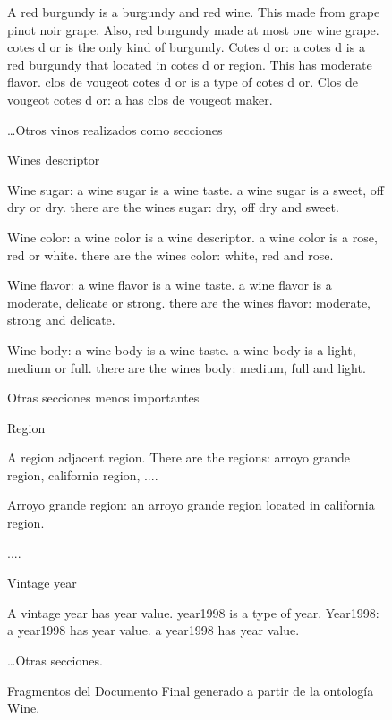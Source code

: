 \begin{figure}
{\begin{minipage}{14cm}
\small{
A red burgundy is a burgundy and red wine. This made from grape pinot noir grape. Also, red burgundy made at most one wine grape. cotes d or is the only kind of burgundy. 
Cotes d or: a cotes d is a red burgundy that located in cotes d or region. This has moderate flavor. clos de vougeot cotes d or is a type of cotes d or. 
Clos de vougeot cotes d or:	a has clos de vougeot maker. 
}

\small{\dots Otros vinos realizados como secciones}

\large{
 Wines descriptor
}

\small{
Wine sugar:	a wine sugar is a wine taste. a wine sugar is a sweet, off dry or dry. there are the wines sugar: dry, off dry and sweet. 

Wine color: a wine color is a wine descriptor. a wine color is a rose, red or white. there are the wines color: white, red and rose. 

Wine flavor: a wine flavor is a wine taste. a wine flavor is a moderate, delicate or strong. there are the wines flavor: moderate, strong and delicate. 

Wine body: a wine body is a wine taste. a wine body is a light, medium or full. there are the wines body: medium, full and light. 
}

\large{
\noindent Otras secciones menos importantes
}

\large{
 Region
}

\small{
A region adjacent region. There are the regions: arroyo grande region, california region, ....

Arroyo grande region: an arroyo grande region located in california region. 

....
}

\large{
 Vintage year
}

\small{
A vintage year has year value. year1998 is a type of year. 
Year1998: a year1998 has year value. a year1998 has year value. 
}

\small{
\dots Otras secciones.
}

\end{minipage}
}
\caption{Fragmentos del Documento Final generado a partir de la ontología Wine.}
\label{fig:doc_final_wine}
\end{figure}

